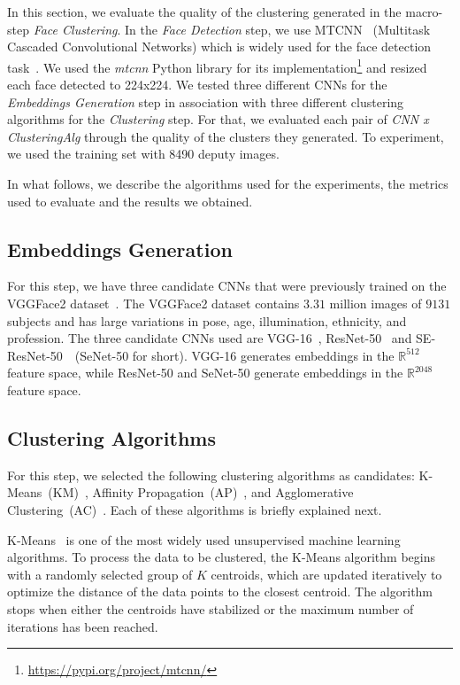 In this section, we evaluate the quality of the clustering generated in the macro-step \emph{Face Clustering}.
In the \emph{Face Detection} step, we use MTCNN~\cite{mtcnn} (Multitask
Cascaded Convolutional Networks) which is widely used for the face detection task~\cite{mtcnn1, mtcnn3}.
We used the  \emph{mtcnn} Python library for its implementation\footnote{\url{https://pypi.org/project/mtcnn/}} and resized each face detected to 224x224.
We tested three different CNNs for the \emph{Embeddings Generation} step in association with three different clustering algorithms for the \emph{Clustering} step.
For that, we evaluated each pair of \emph{CNN x ClusteringAlg} through the quality of the clusters they generated. 
To experiment, we used the training set with 8490 deputy images.

In what follows, we describe the algorithms used for the experiments, the metrics used to evaluate and the results we obtained.

\subsection{Embeddings Generation}

For this step, we have three candidate CNNs that were previously trained on the VGGFace2 dataset~\cite{cao2018vggface2}. 
The VGGFace2 dataset contains $3.31$ million images of $9131$ subjects and has large variations in pose, age, illumination, ethnicity, and profession.
The three candidate CNNs used are VGG-16~\cite{vgg16}, ResNet-50~\cite{resnet} and SE-ResNet-50~\cite{senet}~(SeNet-50 for short). VGG-16 generates embeddings in the $\mathbb{R}^{512}$  feature space, while ResNet-50 and SeNet-50 generate embeddings in the $\mathbb{R}^{2048}$ feature space. 


\subsection{Clustering Algorithms}
For this step, we selected the following clustering algorithms as candidates: K-Means~(KM)~\cite{lloyd1982least}, Affinity Propagation~(AP)~\cite{frey2007clustering}, and Agglomerative Clustering~(AC)~\cite{ward1963hierarchical}. Each of these algorithms is briefly explained next.

K-Means~\cite{lloyd1982least} is one of the most widely used unsupervised machine learning algorithms. 
To process the data to be clustered, the K-Means algorithm begins with a randomly selected group of $K$ centroids, which are updated iteratively to optimize the distance of the data points to the closest centroid.
The algorithm stops when either the centroids have stabilized or the maximum number of iterations has been reached.

